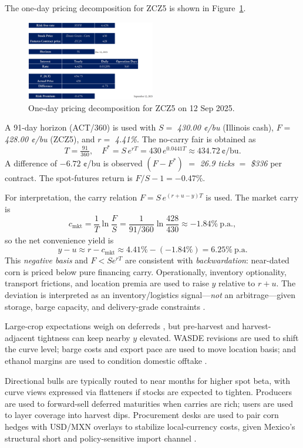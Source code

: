 \documentclass[11pt,a4paper]{article} %
\begin{document}
The one-day pricing decomposition for ZCZ5 is shown in Figure~\ref{fig:corn_one_day}.

\begin{figure}[h]
  \centering
  \includegraphics[width=0.5\textwidth]{figures/corn2.png}
  \caption{One-day pricing decomposition for ZCZ5 on 12 Sep 2025.}
  \label{fig:corn_one_day}
\end{figure}

A 91-day horizon (ACT/360) is used with \(S=\) \textit{430.00 ¢/bu} (Illinois cash), \(F=\) \textit{428.00 ¢/bu} (ZCZ5), and \(r=\) \textit{4.41\%}. The no-carry fair is obtained as
\[
T=\tfrac{91}{360},\quad F^{*}=S\,e^{rT}=430\,e^{0.0441T}\approx {434.72}\ \text{¢/bu}.
\]
A difference of \({-6.72}\) ¢/bu is observed \((F-F^{*})\) \(=\) \textit{26.9 ticks} \(=\) \textit{\$336} per contract. The spot-futures return is \(F/S-1={-0.47\%}\).

For interpretation, the carry relation \(F=S\,e^{(r+u-y)T}\) is used. The market carry is
\[
c_{\text{mkt}}=\frac{1}{T}\ln\!\frac{F}{S}
=\frac{1}{91/360}\ln\!\frac{428}{430}\approx {-1.84\%}\ \text{p.a.},
\]
so the net convenience yield is
\[
y-u \approx r-c_{\text{mkt}}\approx 4.41\%-(-1.84\%)={6.25\%}\ \text{p.a.}
\]
This \emph{negative basis} and \(F<S e^{rT}\) are consistent with \textit{backwardation}: near-dated corn is priced below pure financing carry. Operationally, inventory optionality, transport frictions, and location premia are used to raise \(y\) relative to \(r+u\). The deviation is interpreted as an inventory/logistics signal—\emph{not} an arbitrage—given storage, barge capacity, and delivery-grade constraints \citep{ams_gtr_2023,ncga_storage_2025}.


Large-crop expectations weigh on deferreds \citep{reuters_record_crop_2025}, but pre-harvest and harvest-adjacent tightness can keep nearby \(y\) elevated. WASDE revisions are used to shift the curve level; barge costs and export pace are used to move location basis; and ethanol margins are used to condition domestic offtake \citep{usda_wasde,ams_gtr_2023,ers_ethanol_40}.

\medskip
\noindent Directional bulls are typically routed to near months for higher spot beta, with curve views expressed via flatteners if stocks are expected to tighten. Producers are used to forward-sell deferred maturities when carries are rich; users are used to layer coverage into harvest dips. Procurement desks are used to pair corn hedges with USD/MXN overlays to stabilize local-currency costs, given Mexico's structural short and policy-sensitive import channel \citep{fas_mexico_grain_annual_2025}.
\end{document}
